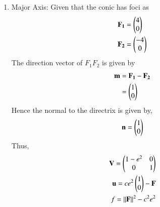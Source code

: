\documentclass[journal,12pt,twocolumn]{IEEEtran}
\begin{document}
\begin{enumerate}
\begin{enumerate}
\item Major Axis: Given that the conic has foci as
\begin{align}
\mathbf{F_1} &= \begin{pmatrix}4\\0\end{pmatrix}\\
\mathbf{F_2} &= \begin{pmatrix}-4\\0\end{pmatrix}
\end{align}
The direction vector of $F_1F_2$ is given by
\begin{align}
\mathbf{m} &= \mathbf{F_1} - \mathbf{F_2}\\
&= \begin{pmatrix}1\\0\end{pmatrix}
\end{align}
Hence the normal to the directrix is given by,
\begin{align}
\mathbf{n} = \begin{pmatrix}1\\0\end{pmatrix}
\end{align}
Thus,
\begin{align}
\mathbf{V} = \begin{pmatrix}1-e^2&0\\0&1\end{pmatrix} \label{eq:5} \\
\mathbf{u} = ce^2\begin{pmatrix}1\\0\end{pmatrix} - \mathbf{F} \label{eq:6} \\
f = \left\lVert\mathbf{F}\right\rVert^2 - c^2e^2 \label{eq:7}
\end{align}


\end{enumerate}
\end{enumerate}
\end{document}
